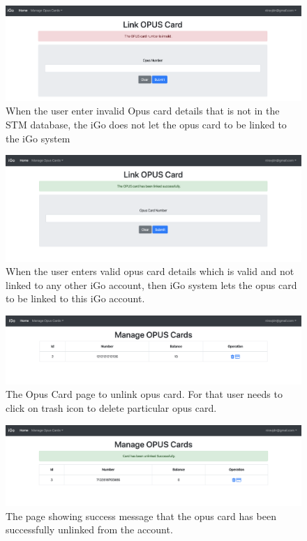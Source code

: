 \documentclass[11pt, english]{report}
\begin{document}
\begin{figure}[H]
  \includegraphics[width=1\textwidth]{images/invalid_opus_card_number.png}
  \centering
  \caption{When the user enter invalid Opus card details that is not in the STM database, the iGo does not let the opus card to be linked to the iGo system}
\end{figure}

\begin{figure}[H]
  \includegraphics[width=1\textwidth]{images/link_opus_card_successful.png}
  \centering
  \caption{When the user enters valid opus card details which is valid and not linked to any other iGo account, then iGo system lets the opus card to be linked to this iGo account.}
\end{figure}


\begin{figure}[H]
  \includegraphics[width=1\textwidth]{images/manage_opus_card_page.png}
  \centering
  \caption{The Opus Card page to unlink opus card. For that user needs to click on trash icon to delete particular opus card.}
\end{figure}

\begin{figure}[H]
  \includegraphics[width=1\textwidth]{images/unlink_opus_card.png}
  \centering
  \caption{The page showing success message that the opus card has been successfully unlinked from the account.}
\end{figure}
\end{document}
